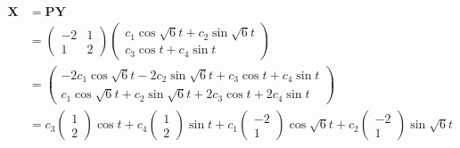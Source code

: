 \documentclass{article}
\begin{document}
\begin{enumerate}
        \begin{align*}
          \mathbf{X} & = \mathbf{P Y}                                                                                                                \\
                     & = \begin{pmatrix}
                           -2 & 1 \\
                           1  & 2
                         \end{pmatrix} \begin{pmatrix}
                                         c_1 \cos \sqrt{6} t + c_2 \sin \sqrt{6} t \\
                                         c_3 \cos t + c_4 \sin t
                                       \end{pmatrix}                                                                     \\
                     & = \begin{pmatrix}
                           -2 c_1 \cos \sqrt{6} t - 2 c_2 \sin \sqrt{6} t + c_3 \cos t + c_4 \sin t \\
                           c_1 \cos \sqrt{6} t + c_2 \sin \sqrt{6} t + 2 c_3 \cos t + 2 c_4 \sin t
                         \end{pmatrix}                                                    \\
                     & = c_3 \begin{pmatrix}
                               1 \\
                               2
                             \end{pmatrix} \cos t + c_4 \begin{pmatrix}
                                                          1 \\
                                                          2
                                                        \end{pmatrix} \sin t + c_1 \begin{pmatrix}
                                                                                     -2 \\
                                                                                     1
                                                                                   \end{pmatrix} \cos \sqrt{6} t + c_2 \begin{pmatrix}
                                                                                                                         -2 \\
                                                                                                                         1
                                                                                                                       \end{pmatrix} \sin \sqrt{6} t
        \end{align*}
\end{enumerate}
\end{document}
